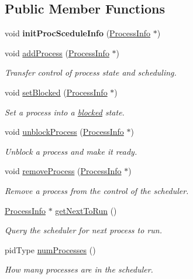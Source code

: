 \subsection*{\-Public \-Member \-Functions}
\begin{DoxyCompactItemize}
\item 
\hypertarget{classcLottery_afc7e0be521a40e6a0c3d9e96804ffcb2}{void {\bfseries init\-Proc\-Scedule\-Info} (\hyperlink{structProcessInfo}{\-Process\-Info} $\ast$)}\label{dd/dc8/classcLottery_afc7e0be521a40e6a0c3d9e96804ffcb2}

\item 
void \hyperlink{classcLottery_ae250b46d5d3032d40f49b8539cbd9faf}{add\-Process} (\hyperlink{structProcessInfo}{\-Process\-Info} $\ast$)
\begin{DoxyCompactList}\small\item\em \-Transfer control of process state and scheduling. \end{DoxyCompactList}\item 
void \hyperlink{classcLottery_afa726859adb7b98f1ad80a41c196e488}{set\-Blocked} (\hyperlink{structProcessInfo}{\-Process\-Info} $\ast$)
\begin{DoxyCompactList}\small\item\em \-Set a process into a \hyperlink{process_8h_a2c72cb00af5be695c1f898162350821fa035732e2026cb263f1bd9eee6ca6ae01}{blocked} state. \end{DoxyCompactList}\item 
void \hyperlink{classcLottery_a86bf3ddc6da1a45ffb073a843d744c60}{unblock\-Process} (\hyperlink{structProcessInfo}{\-Process\-Info} $\ast$)
\begin{DoxyCompactList}\small\item\em \-Unblock a process and make it ready. \end{DoxyCompactList}\item 
void \hyperlink{classcLottery_aa995fc5a68b398aa526e504fed2f7a59}{remove\-Process} (\hyperlink{structProcessInfo}{\-Process\-Info} $\ast$)
\begin{DoxyCompactList}\small\item\em \-Remove a process from the control of the scheduler. \end{DoxyCompactList}\item 
\hyperlink{structProcessInfo}{\-Process\-Info} $\ast$ \hyperlink{classcLottery_a4df695e7e524164321f92eafd329fbaa}{get\-Next\-To\-Run} ()
\begin{DoxyCompactList}\small\item\em \-Query the scheduler for next process to run. \end{DoxyCompactList}\item 
pid\-Type \hyperlink{classcLottery_a4f77d186c1f4cbb82d3fff077bba7736}{num\-Processes} ()
\begin{DoxyCompactList}\small\item\em \-How many processes are in the scheduler. \end{DoxyCompactList}\end{DoxyCompactItemize}
